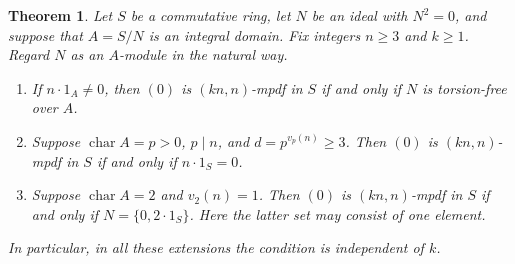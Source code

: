 \documentclass[11pt,a4paper]{amsart}
\newtheorem{theorem}{Theorem}[section]
\theoremstyle{definition}
\theoremstyle{remark}
\numberwithin{equation}{section}
\begin{document}
\begin{theorem}\label{thm:squarezero-domain}
Let $S$ be a commutative ring, let $N$ be an ideal with $N^2=0$, and suppose
that $A=S/N$ is an integral domain. Fix integers $n\geq3$ and $k\geq1$.
Regard $N$ as an $A$-module in the natural way.
\begin{enumerate}
\item If $n\cdot1_A\neq0$, then $(0)$ is $(kn,n)$-mpdf in $S$ if and only
if $N$ is torsion-free over $A$.
\item Suppose $\operatorname{char}A=p>0$, $p\mid n$, and
$d=p^{v_p(n)}\geq3$. Then $(0)$ is $(kn,n)$-mpdf in $S$ if and only if
$n\cdot1_S=0$.
\item Suppose $\operatorname{char}A=2$ and $v_2(n)=1$. Then $(0)$ is
$(kn,n)$-mpdf in $S$ if and only if $N=\{0,2\cdot1_S\}$.
Here the latter set may consist of one element.
\end{enumerate}
In particular, in all these extensions the condition is independent of $k$.
\end{theorem}
\end{document}
